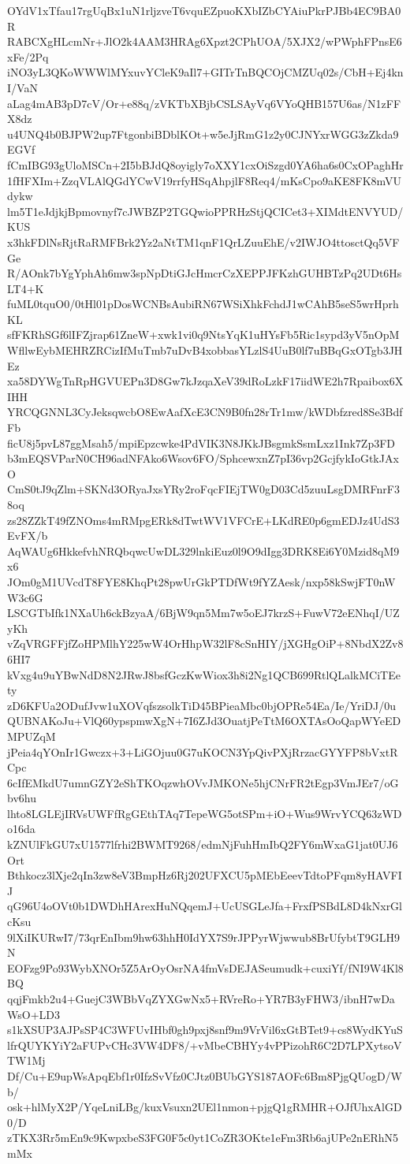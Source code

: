 OYdV1xTfau17rgUqBx1uN1rljzveT6vquEZpuoKXbIZbCYAiuPkrPJBb4EC9BA0R
RABCXgHLcmNr+JlO2k4AAM3HRAg6Xpzt2CPhUOA/5XJX2/wPWphFPnsE6xFe/2Pq
iNO3yL3QKoWWWlMYxuvYCleK9aIl7+GITrTnBQCOjCMZUq02s/CbH+Ej4knI/VaN
aLag4mAB3pD7cV/Or+e88q/zVKTbXBjbCSLSAyVq6VYoQHB157U6as/N1zFFX8dz
u4UNQ4b0BJPW2up7FtgonbiBDblKOt+w5eJjRmG1z2y0CJNYxrWGG3zZkda9EGVf
fCmIBG93gUloMSCn+2I5bBJdQ8oyigly7oXXY1cxOiSzgd0YA6ha6s0CxOPaghHr
1fHFXIm+ZzqVLAlQGdYCwV19rrfyHSqAhpjlF8Req4/mKsCpo9aKE8FK8mVUdykw
lm5T1eJdjkjBpmovnyf7cJWBZP2TGQwioPPRHzStjQCICet3+XIMdtENVYUD/KUS
x3hkFDlNsRjtRaRMFBrk2Yz2aNtTM1qnF1QrLZuuEhE/v2IWJO4ttosctQq5VFGe
R/AOnk7bYgYphAh6mw3spNpDtiGJcHmcrCzXEPPJFKzhGUHBTzPq2UDt6HsLT4+K
fuML0tquO0/0tHl01pDosWCNBsAubiRN67WSiXhkFchdJ1wCAhB5seS5wrHprhKL
sfFKRhSGf6lIFZjrap61ZneW+xwk1vi0q9NtsYqK1uHYsFb5Ric1sypd3yV5nOpM
WfllwEybMEHRZRCizIfMuTmb7uDvB4xobbasYLzlS4UuB0lf7uBBqGxOTgb3JHEz
xa58DYWgTnRpHGVUEPn3D8Gw7kJzqaXeV39dRoLzkF17iidWE2h7Rpaibox6XIHH
YRCQGNNL3CyJeksqwcbO8EwAafXcE3CN9B0fn28rTr1mw/kWDbfzred8Se3BdfFb
ficU8j5pvL87ggMsah5/mpiEpzcwke4PdVIK3N8JKkJBsgmkSsmLxz1Ink7Zp3FD
b3mEQSVParN0CH96adNFAko6Wsov6FO/SphcewxnZ7pI36vp2GcjfykIoGtkJAxO
CmS0tJ9qZlm+SKNd3ORyaJxsYRy2roFqcFIEjTW0gD03Cd5zuuLsgDMRFnrF38oq
zs28ZZkT49fZNOms4mRMpgERk8dTwtWV1VFCrE+LKdRE0p6gmEDJz4UdS3EvFX/b
AqWAUg6HkkefvhNRQbqwcUwDL329lnkiEuz0l9O9dIgg3DRK8Ei6Y0Mzid8qM9x6
JOm0gM1UVcdT8FYE8KhqPt28pwUrGkPTDfWt9fYZAesk/nxp58kSwjFT0nWW3c6G
LSCGTbIfk1NXaUh6ckBzyaA/6BjW9qn5Mm7w5oEJ7krzS+FuwV72eENhqI/UZyKh
vZqVRGFFjfZoHPMlhY225wW4OrHhpW32lF8cSnHIY/jXGHgOiP+8NbdX2Zv86HI7
kVxg4u9uYBwNdD8N2JRwJ8bsfGczKwWiox3h8i2Ng1QCB699RtlQLalkMCiTEety
zD6KFUa2ODufJvw1uXOVqfszsolkTiD45BPieaMbc0bjOPRe54Ea/Ie/YriDJ/0u
QUBNAKoJu+VlQ60ypspmwXgN+7I6ZJd3OuatjPeTtM6OXTAsOoQapWYeEDMPUZqM
jPeia4qYOnIr1Gwczx+3+LiGOjuu0G7uKOCN3YpQivPXjRrzacGYYFP8bVxtRCpc
6cIfEMkdU7umnGZY2eShTKOqzwhOVvJMKONe5hjCNrFR2tEgp3VmJEr7/oGbv6hu
lhto8LGLEjIRVsUWFfRgGEthTAq7TepeWG5otSPm+iO+Wus9WrvYCQ63zWDo16da
kZNUlFkGU7xU1577lfrhi2BWMT9268/edmNjFuhHmIbQ2FY6mWxaG1jat0UJ6Ort
Bthkocz3lXje2qIn3zw8eV3BmpHz6Rj202UFXCU5pMEbEeevTdtoPFqm8yHAVFIJ
qG96U4oOVt0b1DWDhHArexHuNQqemJ+UcUSGLeJfa+FrxfPSBdL8D4kNxrGlcKsu
9lXiIKURwI7/73qrEnIbm9hw63hhH0IdYX7S9rJPPyrWjwwub8BrUfybtT9GLH9N
EOFzg9Po93WybXNOr5Z5ArOyOsrNA4fmVsDEJASeumudk+cuxiYf/fNI9W4Kl8BQ
qqjFmkb2u4+GuejC3WBbVqZYXGwNx5+RVreRo+YR7B3yFHW3/ibnH7wDaWsO+LD3
s1kXSUP3AJPsSP4C3WFUvIHbf0gh9pxj8snf9m9VrVil6xGtBTet9+cs8WydKYuS
lfrQUYKYiY2aFUPvCHc3VW4DF8/+vMbeCBHYy4vPPizohR6C2D7LPXytsoVTW1Mj
Df/Cu+E9upWsApqEbf1r0IfzSvVfz0CJtz0BUbGYS187AOFc6Bm8PjgQUogD/Wb/
osk+hlMyX2P/YqeLniLBg/kuxVsuxn2UEl1nmon+pjgQ1gRMHR+OJfUhxAlGD0/D
zTKX3Rr5mEn9c9KwpxbeS3FG0F5c0yt1CoZR3OKte1eFm3Rb6ajUPe2nERhN5mMx
